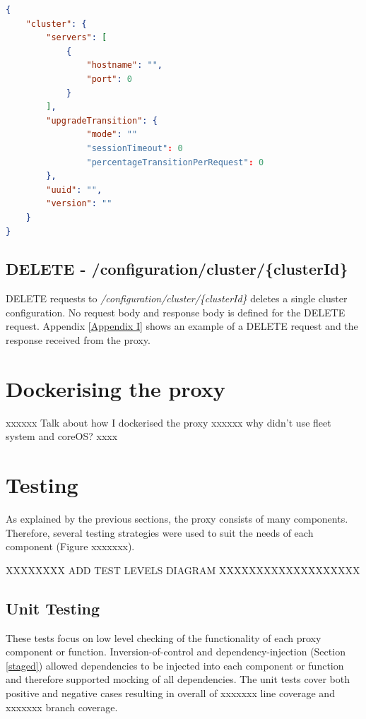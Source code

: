 \documentclass[a4paper,11pt,twoside]{report}
\begin{document}
\begin{lstlisting}[language=json]
{
    "cluster": {
        "servers": [
            {
                "hostname": "",
                "port": 0
            }
        ],
        "upgradeTransition": {
                "mode": ""
                "sessionTimeout": 0  
                "percentageTransitionPerRequest": 0  
        },
        "uuid": "",
        "version": ""
    }
}

\end{lstlisting}

\subsection{DELETE - /configuration/cluster/\{clusterId\}}
DELETE requests to \textit{/configuration/cluster/\{clusterId\}} deletes a single cluster configuration. No request body and response body is defined for the DELETE request. Appendix \ref{Appendix I} shows an example of a DELETE request and the response received from the proxy.


\section{Dockerising the proxy}
xxxxxx
Talk about how I dockerised the proxy \bigskip
xxxxxx
why didn't use fleet system and coreOS? \bigskip
xxxx

\section{Testing}
As explained by the previous sections, the proxy consists of many components. Therefore, several testing strategies were used to suit the needs of each component (Figure xxxxxxx).\bigskip

XXXXXXXX ADD TEST LEVELS DIAGRAM  XXXXXXXXXXXXXXXXXXX\bigskip

\subsection{Unit Testing}
These tests focus on low level checking of the functionality of each proxy component or function. Inversion-of-control and dependency-injection (Section \ref{staged}) allowed dependencies to be injected into each component or function and therefore supported mocking of all dependencies. The unit tests cover both positive and negative cases resulting in overall of xxxxxxx line coverage and xxxxxxx branch coverage.\bigskip    
\end{document}
